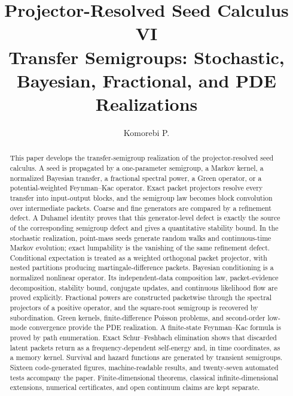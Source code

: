 \documentclass[11pt]{article}
\title{\textbf{Projector-Resolved Seed Calculus VI}\\[0.45em]
\large Transfer Semigroups: Stochastic, Bayesian, Fractional, and PDE Realizations}
\author{Komorebi P.}
\date{}
\theoremstyle{definition}
\theoremstyle{remark}
\begin{document}
\maketitle

\begin{abstract}
This paper develops the transfer-semigroup realization of the projector-resolved seed calculus. A seed is propagated by a one-parameter semigroup, a Markov kernel, a normalized Bayesian transfer, a fractional spectral power, a Green operator, or a potential-weighted Feynman--Kac operator. Exact packet projectors resolve every transfer into input-output blocks, and the semigroup law becomes block convolution over intermediate packets. Coarse and fine generators are compared by a refinement defect. A Duhamel identity proves that this generator-level defect is exactly the source of the corresponding semigroup defect and gives a quantitative stability bound. In the stochastic realization, point-mass seeds generate random walks and continuous-time Markov evolution; exact lumpability is the vanishing of the same refinement defect. Conditional expectation is treated as a weighted orthogonal packet projector, with nested partitions producing martingale-difference packets. Bayesian conditioning is a normalized nonlinear operator. Its independent-data composition law, packet-evidence decomposition, stability bound, conjugate updates, and continuous likelihood flow are proved explicitly. Fractional powers are constructed packetwise through the spectral projectors of a positive operator, and the square-root semigroup is recovered by subordination. Green kernels, finite-difference Poisson problems, and second-order low-mode convergence provide the PDE realization. A finite-state Feynman--Kac formula is proved by path enumeration. Exact Schur--Feshbach elimination shows that discarded latent packets return as a frequency-dependent self-energy and, in time coordinates, as a memory kernel. Survival and hazard functions are generated by transient semigroups. Sixteen code-generated figures, machine-readable results, and twenty-seven automated tests accompany the paper. Finite-dimensional theorems, classical infinite-dimensional extensions, numerical certificates, and open continuum claims are kept separate.
\end{abstract}
\end{document}
